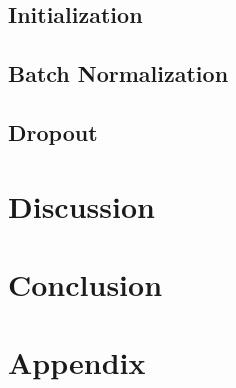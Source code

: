 \documentclass{article}[12pt]
\begin{document}
\subsection{Initialization}

\subsection{Batch Normalization}

\subsection{Dropout}

\section{Discussion}\label{sec:discussion}


\section{Conclusion}\label{sec:conclusion}


\section{Appendix}\label{sec:appendix}
\end{document}
